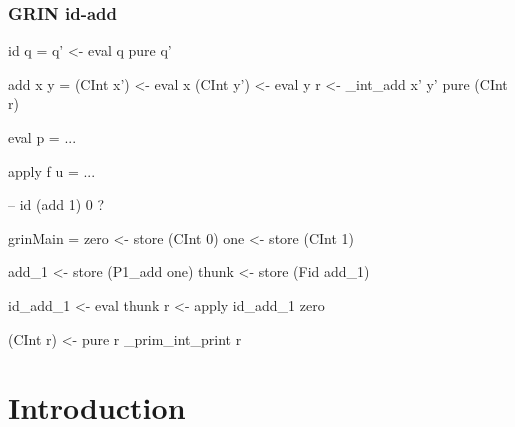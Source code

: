 \documentclass[bigger]{beamer}
\begin{document}
\begin{frame}[fragile]
\frametitle{GRIN id-add}
\begin{center}

	\begin{minipage}{0.40\textwidth}
		\begin{haskellcode}
			id q =
			 q' <- eval q
			 pure q'
		\end{haskellcode}
		\begin{haskellcode}
			add x y =
			 (CInt x') <- eval x
			 (CInt y') <- eval y
			 r <- _int_add x' y'
			 pure (CInt r)
		\end{haskellcode}
		\begin{haskellcode}
			eval p = ...
		\end{haskellcode}
		\begin{haskellcode}
			apply f u = ...
		\end{haskellcode}
	\end{minipage}
	\hfill
	\begin{minipage}{0.55\textwidth}
		\begin{haskellcode}
			-- id (add 1) 0 ?
		\end{haskellcode}
		\vspace{-0.60cm}
		\pause
		\begin{haskellcode}
		grinMain =
		 zero <- store (CInt 0)
		 one  <- store (CInt 1)

		 add_1 <- store (P1_add one)
		 thunk <- store (Fid add_1)

		 id_add_1 <- eval thunk
		 r <- apply id_add_1 zero

		 (CInt r) <- pure r
		 _prim_int_print r
		\end{haskellcode}
	\end{minipage}

\end{center}
\end{frame}







\section{Introduction}
\end{document}
